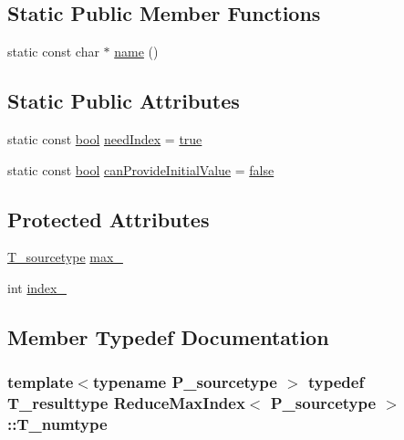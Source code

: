 \subsection*{Static Public Member Functions}
\begin{DoxyCompactItemize}
\item 
static const char $\ast$ \hyperlink{classReduceMaxIndex_ae4b5de4fc3d2c722976cbff65bc69f0c}{name} ()
\end{DoxyCompactItemize}
\subsection*{Static Public Attributes}
\begin{DoxyCompactItemize}
\item 
static const \hyperlink{compiler_8h_abb452686968e48b67397da5f97445f5b}{bool} \hyperlink{classReduceMaxIndex_a522b1a3857414ec84aedd65a85975a00}{need\+Index} = \hyperlink{compiler_8h_a41f9c5fb8b08eb5dc3edce4dcb37fee7}{true}
\item 
static const \hyperlink{compiler_8h_abb452686968e48b67397da5f97445f5b}{bool} \hyperlink{classReduceMaxIndex_a8474d74231f271258c5100bde38516a1}{can\+Provide\+Initial\+Value} = \hyperlink{compiler_8h_a65e9886d74aaee76545e83dd09011727}{false}
\end{DoxyCompactItemize}
\subsection*{Protected Attributes}
\begin{DoxyCompactItemize}
\item 
\hyperlink{classReduceMaxIndex_adfdd5e8fad286a64079e6ddcb46622e9}{T\+\_\+sourcetype} \hyperlink{classReduceMaxIndex_af4a613c8c45e85f7871c111fbfa8f2e3}{max\+\_\+}
\item 
int \hyperlink{classReduceMaxIndex_aaa66337506289488aa45638fadfb6962}{index\+\_\+}
\end{DoxyCompactItemize}


\subsection{Member Typedef Documentation}
\hypertarget{classReduceMaxIndex_a00d9bc74fd8688be2adfe00c25a7cabe}{}
\subsubsection[{T\+\_\+numtype}]{\setlength{\rightskip}{0pt plus 5cm}template$<$typename P\+\_\+sourcetype $>$ typedef {\bf T\+\_\+resulttype} {\bf Reduce\+Max\+Index}$<$ P\+\_\+sourcetype $>$\+::{\bf T\+\_\+numtype}}\label{classReduceMaxIndex_a00d9bc74fd8688be2adfe00c25a7cabe}
\hypertarget{classReduceMaxIndex_a233790a71b058cce73f75ffe7523d1d9}{}
